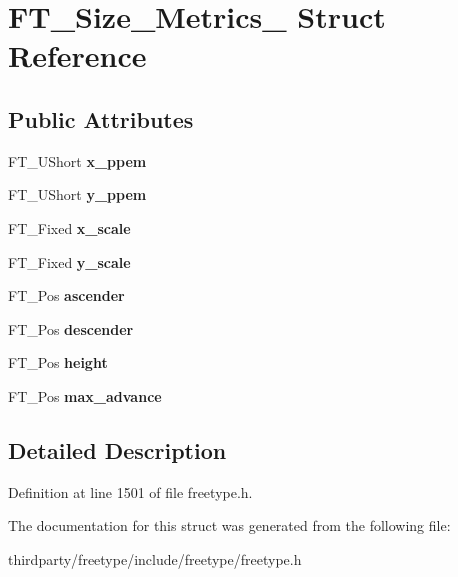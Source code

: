 \hypertarget{struct_f_t___size___metrics__}{}\section{F\+T\+\_\+\+Size\+\_\+\+Metrics\+\_\+ Struct Reference}
\label{struct_f_t___size___metrics__}
\subsection*{Public Attributes}
\begin{DoxyCompactItemize}
\item 
\mbox{\label{struct_f_t___size___metrics___abb42b175a3450e9d8b84483f166d6c8a}} 
F\+T\+\_\+\+U\+Short {\bfseries x\+\_\+ppem}
\item 
\mbox{\label{struct_f_t___size___metrics___abcdb70cb9e39a74679bc39c07f3275f7}} 
F\+T\+\_\+\+U\+Short {\bfseries y\+\_\+ppem}
\item 
\mbox{\label{struct_f_t___size___metrics___a5e92028bb9881e107a6fb75d557eaff1}} 
F\+T\+\_\+\+Fixed {\bfseries x\+\_\+scale}
\item 
\mbox{\label{struct_f_t___size___metrics___a1f8b1cb3538b9920127f721dd061379d}} 
F\+T\+\_\+\+Fixed {\bfseries y\+\_\+scale}
\item 
\mbox{\label{struct_f_t___size___metrics___ab5fde60a2661d7b774f61c264a2a6070}} 
F\+T\+\_\+\+Pos {\bfseries ascender}
\item 
\mbox{\label{struct_f_t___size___metrics___a9b2ca3a4391803e8721ed99eb9953d52}} 
F\+T\+\_\+\+Pos {\bfseries descender}
\item 
\mbox{\label{struct_f_t___size___metrics___ae3361e264fb8a9e669f118bdb244439b}} 
F\+T\+\_\+\+Pos {\bfseries height}
\item 
\mbox{\label{struct_f_t___size___metrics___ac315a7a834ac1a57c7169ce021718958}} 
F\+T\+\_\+\+Pos {\bfseries max\+\_\+advance}
\end{DoxyCompactItemize}


\subsection{Detailed Description}


Definition at line 1501 of file freetype.\+h.



The documentation for this struct was generated from the following file\+:\begin{DoxyCompactItemize}
\item 
thirdparty/freetype/include/freetype/freetype.\+h\end{DoxyCompactItemize}
